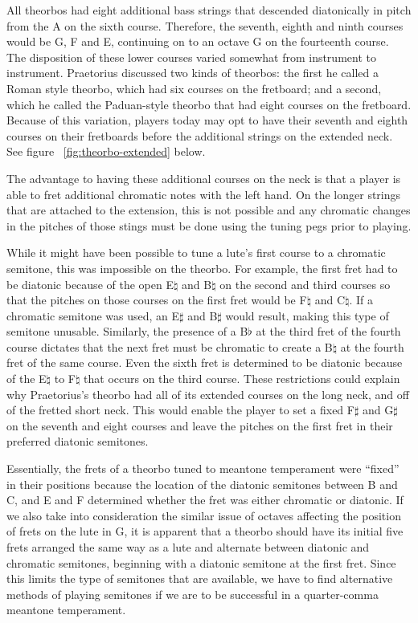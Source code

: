 All theorbos had eight additional bass strings that descended diatonically in
pitch from the A on the sixth course.  Therefore, the seventh, eighth and ninth
courses would be G, F and E, continuing on to an octave G on the fourteenth
course.  The disposition of these lower courses varied somewhat from instrument
to instrument.  Praetorius discussed two kinds of theorbos: the first he called
a Roman style theorbo, which had six courses on the fretboard; and a second,
which he called the Paduan-style theorbo that had eight courses on the
fretboard. \autocite[59]{MP:1}  Because of this variation, players today may
opt to have their seventh and eighth courses on their fretboards before the
additional strings on the extended neck. See figure ~\ref{fig:theorbo-extended}
below.

The advantage to having these additional courses on the neck is that a player is
able to fret additional chromatic notes with the left hand.  On the longer
strings that are attached to the extension, this is not possible and any
chromatic changes in the pitches of those stings must be done using the tuning
pegs prior to playing.

While it might have been possible to tune a lute's first course to a chromatic semitone,
this was impossible on the theorbo. For example, the first fret had to be diatonic because
of the open E$\natural$ and B$\natural$ on the second and third courses so that the
pitches on those courses on the first fret would be F$\natural$ and C$\natural$.  If a
chromatic semitone was used, an E$\sharp$ and B$\sharp$ would result, making this type of
semitone unusable. Similarly, the presence of a B$\flat$ at the third fret of the fourth
course dictates that the next fret must be chromatic to create a B$\natural$ at the fourth
fret of the same course. Even the sixth fret is determined to be diatonic because of the
E$\natural$ to F$\natural$ that occurs on the third course.  These restrictions could
explain why Praetorius's theorbo had all of its extended courses on the long neck, and
off of the fretted short neck.  This would enable the player to set a fixed F$\sharp$ and 
G$\sharp$ on the seventh and eight courses and leave the pitches on the first fret in
their preferred diatonic semitones. 

Essentially, the frets of a theorbo tuned to meantone temperament were ``fixed'' in
their positions because the location of the diatonic semitones between B and C, and E
and F determined whether the fret was either chromatic or diatonic.  If we also take into
consideration the similar issue of octaves affecting the position of frets on the lute
in G, it is apparent that a theorbo should have its initial five frets arranged the
same way as a lute and alternate between diatonic and chromatic semitones, beginning
with a diatonic semitone at the first fret.  Since this limits the type of semitones
that are available, we have to find alternative methods of playing semitones if we are
to be successful in a quarter-comma meantone temperament.

